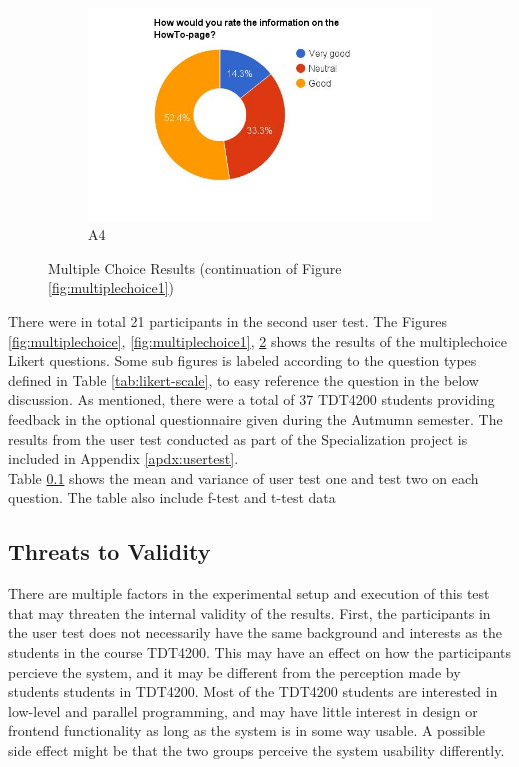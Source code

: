 \begin{figure}
    \begin{subfigure}[h]{0.45\textwidth}
        \centerline{\includegraphics[width=1.5\textwidth]{results/howto_cmb.jpg}}
        \caption{A4}
        \label{fig:cmb-howto}
    \end{subfigure}
    \caption{Multiple Choice Results (continuation of Figure \ref{fig:multiplechoice1})}
    \label{fig:multiplechoice2}
\end{figure}

There were in total 21 participants in the second user test. The Figures \ref{fig:multiplechoice}, \ref{fig:multiplechoice1}, \ref{fig:multiplechoice2} shows the results of the multiplechoice Likert questions. Some sub figures is labeled according to the question types defined in Table \ref{tab:likert-scale}, to easy reference the question in the below discussion. As mentioned, there were a total of 37 TDT4200 students providing feedback in the optional questionnaire given during the Autmumn semester. The results from the user test conducted as part of the Specialization project is included in Appendix \ref{apdx:usertest}. \\

Table \ref{} shows the mean and variance of user test one and test two on each question. The table also include f-test and t-test data

\subsection{Threats to Validity}
There are multiple factors in the experimental setup and execution of this test that may threaten the internal validity of the results. First, the participants in the user test does not necessarily have the same background and interests as the students in the course TDT4200. This may have an effect on how the participants percieve the system, and it may be different from the perception made by students students in TDT4200. Most of the TDT4200 students are interested in low-level and parallel programming, and may have little interest in design or frontend functionality as long as the system is in some way usable. A possible side effect might be that the two groups perceive the system usability differently. \\

